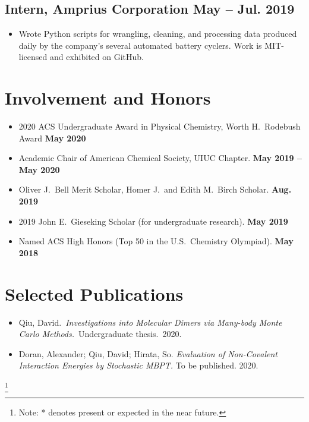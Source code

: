 \documentclass{article}
\begin{document}
\subsection{Intern, Amprius Corporation \hfill May -- Jul. 2019}
\begin{itemize}[noitemsep, nolistsep]
	\item Wrote Python scripts for wrangling, cleaning, and processing data
		produced daily by the company's several automated battery
		cyclers. Work is MIT-licensed and exhibited on GitHub.
\end{itemize}

\section{Involvement and Honors}
\begin{itemize}[noitemsep,nolistsep]
	\item 2020 ACS Undergraduate Award in Physical Chemistry, Worth H.\ Rodebush Award
	\hfill\textbf{May 2020}

	\item Academic Chair of American Chemical Society, UIUC Chapter.
	\hfill\textbf{May 2019 -- May 2020}

	\item Oliver J.\ Bell Merit Scholar, Homer J.\ and Edith M.\ Birch
	Scholar.
	\hfill\textbf{Aug. 2019}

	\item 2019 John E.\ Gieseking Scholar (for undergraduate research).
	\hfill\textbf{May 2019}

	\item Named ACS High Honors (Top 50 in the U.S.\ Chemistry Olympiad).
	\hfill\textbf{May 2018}
\end{itemize}

\section{Selected Publications}

\begin{itemize}[noitemsep, nolistsep]
	\item Qiu, David.\ \emph{Investigations into Molecular Dimers via
		Many-body Monte Carlo Methods.}\ Undergraduate thesis.\ 2020.

	\item Doran, Alexander; Qiu, David; Hirata, So. \emph{Evaluation of
		Non-Covalent Interaction Energies by Stochastic MBPT.} To be
		published. 2020.
\end{itemize}

\newcommand\blfootnote[1]{%
	\begingroup
	\renewcommand\thefootnote{}\footnote{#1}%
	\addtocounter{footnote}{-1}%
	\endgroup
}

\blfootnote{Note: * denotes present or expected in the near future.}
\end{document}
